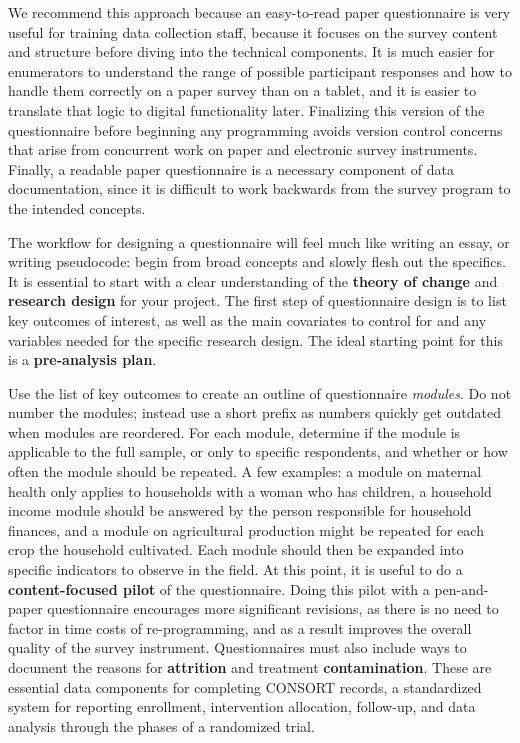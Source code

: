 We recommend this approach because an easy-to-read paper questionnaire
is very useful for training data collection staff,
because it focuses on the survey content and structure
before diving into the technical components.
It is much easier for enumerators to understand
the range of possible participant responses
and how to handle them correctly on a paper survey than on a tablet,
and it is easier to translate that logic to digital functionality later.
Finalizing this version of the questionnaire before beginning any programming
avoids version control concerns that arise from concurrent work
on paper and electronic survey instruments.
Finally, a readable paper questionnaire is a necessary component of data documentation,
since it is difficult to work backwards from the survey program to the intended concepts.

The workflow for designing a questionnaire will feel much like writing an essay, or writing pseudocode:
begin from broad concepts and slowly flesh out the specifics.
It is essential to start with a clear understanding of the
\textbf{theory of change}
and \textbf{research design} for your project.
The first step of questionnaire design is to list key outcomes of interest,
as well as the main covariates to control for and any variables needed for the specific research design.
The ideal starting point for this is a \textbf{pre-analysis plan}.

Use the list of key outcomes to create an outline of questionnaire \textit{modules}.
Do not number the modules; instead use a short prefix
as numbers quickly get outdated when modules are reordered.
For each module, determine if the module is applicable to the full sample,
or only to specific respondents,
and whether or how often the module should be repeated.
A few examples:
a module on maternal health only applies
to households with a woman who has children,
a household income module should be answered
by the person responsible for household finances,
and a module on agricultural production
might be repeated for each crop the household cultivated.
Each module should then be expanded
into specific indicators to observe in the field.
At this point, it is useful to do a  \textbf{content-focused pilot}
of the questionnaire.
Doing this pilot with a pen-and-paper questionnaire encourages more significant revisions,
as there is no need to factor in time costs of re-programming,
and as a result improves the overall quality of the survey instrument.
Questionnaires must also include ways to document the reasons for \textbf{attrition} and
treatment \textbf{contamination}.
These are essential data components for completing CONSORT records,
a standardized system for reporting enrollment, intervention allocation, follow-up,
and data analysis through the phases of a randomized trial.\cite{begg1996improving}


